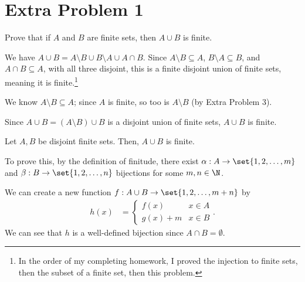 \documentclass[10pt]{mypackage}
\begin{document}
\section{Extra Problem 1}%
\begin{problem}
  Prove that if $A$ and $B$ are finite sets, then $A\cup B$ is finite.
\end{problem}
\begin{solution}
  We have $A\cup B = A\setminus B \cup B\setminus A \cup A\cap B$. Since $A\setminus B\subseteq A$, $B\setminus A\subseteq B$, and $A\cap B\subseteq A$, with all three disjoint, this is a finite disjoint union of finite sets, meaning it is finite.\footnote{In the order of my completing homework, I proved the injection to finite sets, then the subset of a finite set, then this problem.}
\end{solution}
{
  \color{blue}
  \begin{solution}[Proposed]
    We know $A\setminus B \subseteq A$; since $A$ is finite, so too is $A\setminus B$ (by Extra Problem 3).\newline

    Since $A\cup B = \left(A\setminus B\right)\cup B$ is a disjoint union of finite sets, $A\cup B$ is finite.
  \end{solution}
\begin{remark}
  Let $A,B$ be disjoint finite sets. Then, $A\cup B$ is finite.\newline

  To prove this, by the definition of finitude, there exist $\alpha: A\rightarrow \set{1,2,\dots,m}$ and $\beta: B\rightarrow \set{1,2,\dots,n}$ bijections for some $m,n\in \N$.\newline

  We can create a new function $f: A\cup B \rightarrow \set{1,2,\dots,m+n}$ by 
  \begin{align*}
    h(x) &= \begin{cases}
      f(x) & x\in A\\
      g(x) + m & x\in B
    \end{cases}.
  \end{align*}
  We can see that $h$ is a well-defined bijection since $A\cap B = \emptyset$.
\end{remark}
}
\end{document}
